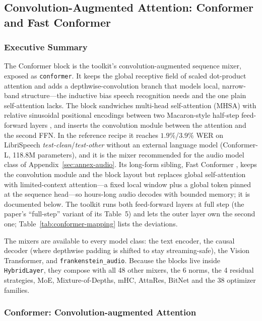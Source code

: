 \subsection{Convolution-Augmented Attention: Conformer and Fast Conformer}
\label{sec:annex-conformer}

\subsubsection{Executive Summary}

The Conformer block \citep{Gulati2020} is the toolkit's convolution-augmented sequence mixer, exposed as \texttt{conformer}. It keeps the global receptive field of scaled dot-product attention and adds a depthwise-convolution branch that models local, narrow-band structure---the inductive bias speech recognition needs and the one plain self-attention lacks. The block sandwiches multi-head self-attention (MHSA) with relative sinusoidal positional encodings between two Macaron-style half-step feed-forward layers \citep{Lu2019}, and inserts the convolution module between the attention and the second FFN. In the reference recipe it reaches $1.9\%$/$3.9\%$ WER on LibriSpeech \emph{test-clean}/\emph{test-other} without an external language model (Conformer-L, 118.8M parameters), and it is the mixer recommended for the audio model class of Appendix~\ref{sec:annex-audio}. Its long-form sibling, Fast Conformer \citep{rekesh_fastconformer_2023}, keeps the convolution module and the block layout but replaces global self-attention with limited-context attention---a fixed local window plus a global token pinned at the sequence head---so hours-long audio decodes with bounded memory; it is documented below. The toolkit runs both feed-forward layers at full step (the paper's ``full-step'' variant of its Table~5) and lets the outer layer own the second one; Table~\ref{tab:conformer-mapping} lists the deviations.

The mixers are available to every model class: the text encoder, the causal decoder (where depthwise padding is shifted to stay streaming-safe), the Vision Transformer, and \texttt{frankenstein\_audio}. Because the blocks live inside \texttt{HybridLayer}, they compose with all 48 other mixers, the 6 norms, the 4 residual strategies, MoE, Mixture-of-Depths, mHC, AttnRes, BitNet and the 38 optimizer families.

\subsubsection{Conformer: Convolution-augmented Attention}

